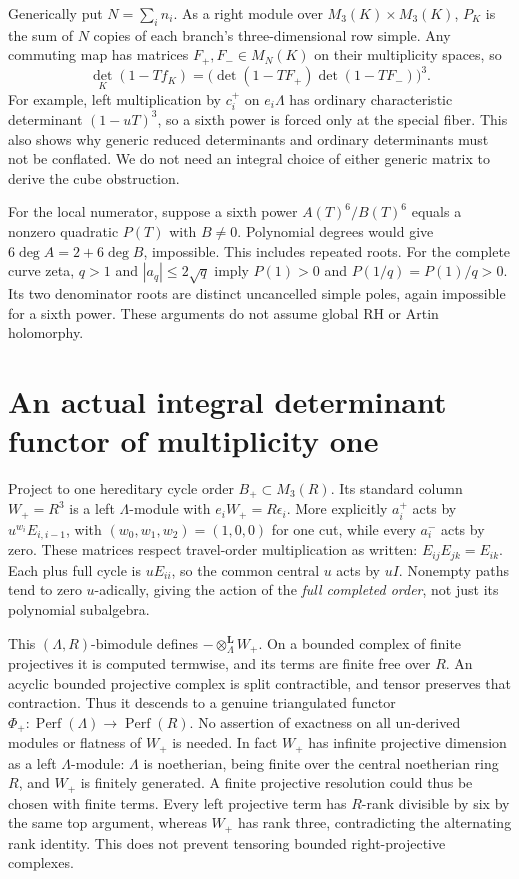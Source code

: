Generically put $N=\sum_i n_i$. As a right module over $M_3(K)\times M_3(K)$, $P_K$ is the sum of $N$ copies of each branch's three-dimensional row simple. Any commuting map has matrices $F_+,F_-\in M_N(K)$ on their multiplicity spaces, so
\[
 \det_K(1-Tf_K)=\bigl(\det(1-TF_+)\det(1-TF_-)\bigr)^3.
\]
For example, left multiplication by $c_i^+$ on $e_i\Lambda$ has ordinary characteristic determinant $(1-uT)^3$, so a sixth power is forced only at the special fiber. This also shows why generic reduced determinants and ordinary determinants must not be conflated. We do not need an integral choice of either generic matrix to derive the cube obstruction.

For the local numerator, suppose a sixth power $A(T)^6/B(T)^6$ equals a nonzero quadratic $P(T)$ with $B\ne0$. Polynomial degrees would give $6\deg A=2+6\deg B$, impossible. This includes repeated roots. For the complete curve zeta, $q>1$ and $|a_q|\le2\sqrt q$ imply $P(1)>0$ and $P(1/q)=P(1)/q>0$. Its two denominator roots are distinct uncancelled simple poles, again impossible for a sixth power. These arguments do not assume global RH or Artin holomorphy.

\section{An actual integral determinant functor of multiplicity one}
Project to one hereditary cycle order $B_+\subset M_3(R)$. Its standard column $W_+=R^3$ is a left $\Lambda$-module with $e_iW_+=R\epsilon_i$. More explicitly $a_i^+$ acts by $u^{w_i}E_{i,i-1}$, with $(w_0,w_1,w_2)=(1,0,0)$ for one cut, while every $a_i^-$ acts by zero. These matrices respect travel-order multiplication as written: $E_{ij}E_{jk}=E_{ik}$. Each plus full cycle is $uE_{ii}$, so the common central $u$ acts by $uI$. Nonempty paths tend to zero $u$-adically, giving the action of the \emph{full completed order}, not just its polynomial subalgebra.

This $(\Lambda,R)$-bimodule defines $-\otimes_\Lambda^{\mathbf L}W_+$. On a bounded complex of finite projectives it is computed termwise, and its terms are finite free over $R$. An acyclic bounded projective complex is split contractible, and tensor preserves that contraction. Thus it descends to a genuine triangulated functor $\Phi_+:\operatorname{Perf}(\Lambda)\to\operatorname{Perf}(R)$. No assertion of exactness on all un-derived modules or flatness of $W_+$ is needed. In fact $W_+$ has infinite projective dimension as a left $\Lambda$-module: $\Lambda$ is noetherian, being finite over the central noetherian ring $R$, and $W_+$ is finitely generated. A finite projective resolution could thus be chosen with finite terms. Every left projective term has $R$-rank divisible by six by the same top argument, whereas $W_+$ has rank three, contradicting the alternating rank identity. This does not prevent tensoring bounded right-projective complexes.

